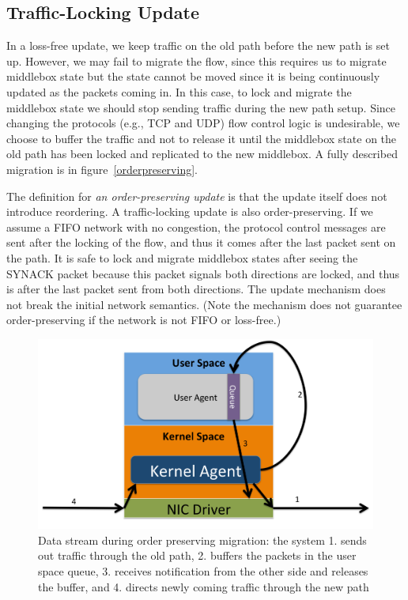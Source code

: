 \subsection{Traffic-Locking Update}

In a loss-free update, we keep traffic on the old path before the new path is set up. However, we may fail to migrate the flow, since this requires us to migrate middlebox state but the state cannot be moved since it is being continuously updated as the packets coming in. In this case, to lock and migrate the middlebox state we should stop sending traffic during the new path setup. Since changing the protocols (e.g., TCP and UDP) flow control logic is undesirable, we choose to buffer the traffic and not to release it until the middlebox state on the old path has been locked and replicated to the new middlebox. A fully described migration is in figure~\ref{orderpreserving}.


The definition for \textit{an order-preserving update} is that the update itself does not introduce reordering. A traffic-locking update is also order-preserving. If we assume a FIFO network with no congestion, the protocol control messages are sent after the locking of the flow, and thus it comes after the last packet sent on the path. It is safe to lock and migrate middlebox states after seeing the SYNACK packet because this packet signals both directions are locked, and thus is after the last packet sent from both directions. The update mechanism does not break the initial network semantics. (Note the mechanism does not guarantee order-preserving if the network is not FIFO or loss-free.) 

\begin{figure}[ht]
\centering
\includegraphics[width=\linewidth]{figures/flowstream.pdf} 

\caption{\small Data stream during order preserving migration: the system 1. sends out traffic through the old path, 2. buffers the packets in the user space queue, 3. receives notification from the other side and releases the buffer, and 4. directs newly coming traffic through the new path}\label{flowstream}
\end{figure}




